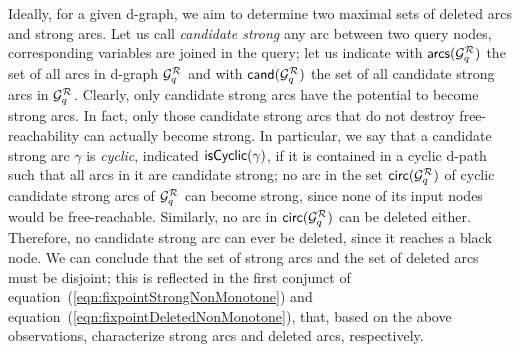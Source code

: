 Ideally, for a given d-graph, we aim to determine two maximal sets
of deleted arcs and strong arcs. Let us call \emph{candidate strong} any arc between two query nodes, 
corresponding variables are joined in the query; let us indicate with
$\textsf{arcs}(\mathcal{G}_q^{\mathcal{R}})$ the set of all arcs in d-graph $\mathcal{G}_q^{\mathcal{R}}$ and with $\textsf{cand}(\mathcal{G}_q^{\mathcal{R}})$ the set
of all candidate strong arcs in $\mathcal{G}_q^{\mathcal{R}}$.
Clearly, only candidate strong arcs have the potential to become strong arcs.
In fact, only those candidate strong arcs that do not destroy free-reachability can actually become strong.
In particular, we say that a candidate strong arc $\gamma$ is \emph{cyclic}, indicated $\mbox{\textsf{isCyclic}}(\gamma)$, if it is contained in a cyclic d-path such that all arcs in it are candidate strong;
no arc in the set $\textsf{circ}(\mathcal{G}_q^{\mathcal{R}})$ of cyclic candidate strong arcs of $\mathcal{G}_q^{\mathcal{R}}$ can become strong, since none of its input nodes would be free-reachable.
Similarly, no arc in $\textsf{circ}(\mathcal{G}_q^{\mathcal{R}})$ can be deleted either.
%
Therefore, no candidate strong arc can ever be deleted, since it reaches a black node.
We can conclude that the set of strong arcs and the set of deleted arcs must be disjoint;
this is reflected in the first conjunct of equation~(\ref{eqn:fixpointStrongNonMonotone}) and equation~(\ref{eqn:fixpointDeletedNonMonotone}), that,
%
%
based on the above observations, characterize strong arcs and deleted arcs, respectively.



